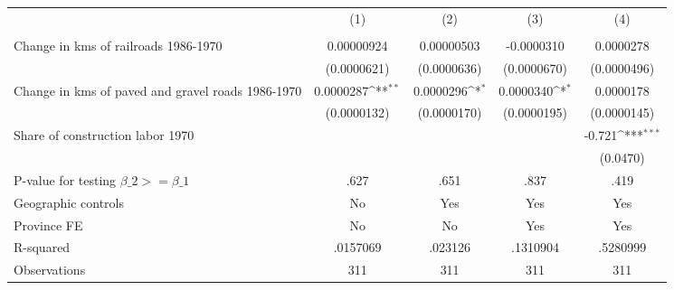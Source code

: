{
\def\sym#1{\ifmmode^{#1}\else\(^{#1}\)\fi}
\begin{tabular}{l*{4}{c}}
\hline\hline
                &\multicolumn{1}{c}{(1)}&\multicolumn{1}{c}{(2)}&\multicolumn{1}{c}{(3)}&\multicolumn{1}{c}{(4)}\\
                &\multicolumn{1}{c}{}&\multicolumn{1}{c}{}&\multicolumn{1}{c}{}&\multicolumn{1}{c}{}\\
\hline
Change in kms of railroads 1986-1970&0.00000924         &0.00000503         &-0.0000310         &0.0000278         \\
                &(0.0000621)         &(0.0000636)         &(0.0000670)         &(0.0000496)         \\
[1em]
Change in kms of paved and gravel roads 1986-1970&0.0000287\sym{**} &0.0000296\sym{*}  &0.0000340\sym{*}  &0.0000178         \\
                &(0.0000132)         &(0.0000170)         &(0.0000195)         &(0.0000145)         \\
[1em]
Share of construction labor 1970&                  &                  &                  &   -0.721\sym{***}\\
                &                  &                  &                  & (0.0470)         \\
\hline
P-value for testing $\beta\_{2} >= \beta\_{1}$&     .627         &     .651         &     .837         &     .419         \\
Geographic controls&       No         &      Yes         &      Yes         &      Yes         \\
Province FE     &       No         &       No         &      Yes         &      Yes         \\
R-squared       & .0157069         &  .023126         & .1310904         & .5280999         \\
Observations    &      311         &      311         &      311         &      311         \\
\hline\hline
\end{tabular}
}
